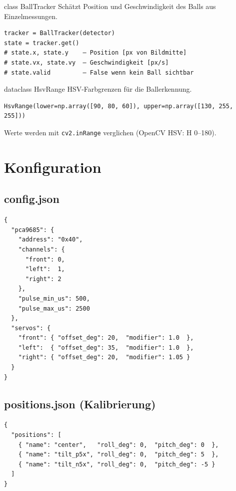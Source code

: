 \documentclass[11pt, a4paper]{scrartcl}
\begin{document}
\begin{apibox}{class BallTracker}
  Schätzt Position und Geschwindigkeit des Balls aus Einzelmessungen.

  \begin{lstlisting}[numbers=none]
tracker = BallTracker(detector)
state = tracker.get()
# state.x, state.y    – Position [px von Bildmitte]
# state.vx, state.vy  – Geschwindigkeit [px/s]
# state.valid         – False wenn kein Ball sichtbar
  \end{lstlisting}
\end{apibox}

\begin{apibox}{dataclass HsvRange}
  HSV-Farbgrenzen für die Ballerkennung.

  \begin{lstlisting}[numbers=none]
HsvRange(lower=np.array([90, 80, 60]), upper=np.array([130, 255, 255]))
  \end{lstlisting}
  Werte werden mit \texttt{cv2.inRange} verglichen (OpenCV HSV: H 0–180).
\end{apibox}

\section{Konfiguration}

\subsection{config.json}

\begin{lstlisting}[language={},caption={config.json Struktur}]
{
  "pca9685": {
    "address": "0x40",
    "channels": {
      "front": 0,
      "left":  1,
      "right": 2
    },
    "pulse_min_us": 500,
    "pulse_max_us": 2500
  },
  "servos": {
    "front": { "offset_deg": 20,  "modifier": 1.0  },
    "left":  { "offset_deg": 35,  "modifier": 1.0  },
    "right": { "offset_deg": 20,  "modifier": 1.05 }
  }
}
\end{lstlisting}

\subsection{positions.json (Kalibrierung)}

\begin{lstlisting}[language={},caption={positions.json für capture\_calibration\_set.py}]
{
  "positions": [
    { "name": "center",   "roll_deg": 0,  "pitch_deg": 0  },
    { "name": "tilt_p5x", "roll_deg": 0,  "pitch_deg": 5  },
    { "name": "tilt_n5x", "roll_deg": 0,  "pitch_deg": -5 }
  ]
}
\end{lstlisting}
\end{document}
